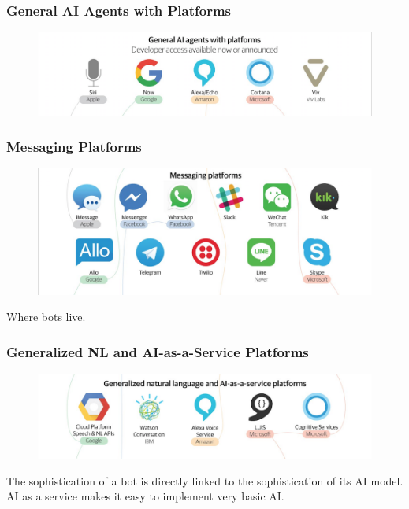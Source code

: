 \documentclass[11pt]{beamer}
\begin{document}
\begin{frame}
\frametitle{General AI Agents with Platforms}
\begin{figure}[h]
	\centering
	\includegraphics[scale=.5]{images/gen-ai-agents}
\end{figure}

\end{frame}

\begin{frame}
\frametitle{Messaging Platforms}
\begin{figure}[h]
	\centering
	\includegraphics[scale=.5]{images/messaging-platforms}
\end{figure}
Where bots live.
\end{frame}

\begin{frame}
\frametitle{Generalized NL and AI-as-a-Service Platforms}
\begin{figure}[h]
	\centering
	\includegraphics[scale=.5]{images/ai-as-a-service}
\end{figure}
The sophistication of a bot is directly linked to the sophistication of its AI model. AI as a service makes it easy to implement very basic AI.
\end{frame}
\end{document}
